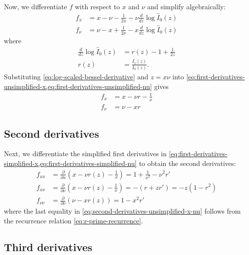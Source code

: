 \documentclass{article}
\begin{document}
Now, we differentiate $f$ with respect to $x$ and $\nu$ and simplify algebraically:
%
\begin{align}
  f_x   & = x-\nu -\frac{1}{2x} - \nu\frac{d}{dz}\log\hat{I}_0(z) \label{eq:first-derivatives-unsimplified-x}  \\
  f_\nu & = \nu-x +\frac{1}{2\nu} - x\frac{d}{dz}\log\hat{I}_0(z) \label{eq:first-derivatives-unsimplified-nu}
\end{align}
%
where
%
\begin{align}
  \frac{d}{dz}\log\hat{I}_0(z) & = r(z) - 1 + \frac{1}{2z} \label{eq:log-scaled-bessel-derivative} \\
  r(z)                         & = \frac{I_1(z)}{I_0(z)}. \label{eq:ratio-r}
\end{align}
%
Substituting \cref{eq:log-scaled-bessel-derivative} and $z=x\nu$ into \cref{eq:first-derivatives-unsimplified-x,eq:first-derivatives-unsimplified-nu} gives
%
\begin{align}
  f_x   & = x - \nu r - \frac{1}{x} \label{eq:first-derivatives-simplified-x} \\
  f_\nu & = \nu - x r \label{eq:first-derivatives-simplified-nu}
\end{align}

\subsection{Second derivatives}

Next, we differentiate the simplified first derivatives in \cref{eq:first-derivatives-simplified-x,eq:first-derivatives-simplified-nu} to obtain the second derivatives:
%
\begin{align}
  f_{xx}     & = \frac{\partial}{\partial x}\left(x - \nu r(z) - \frac{1}{x}\right) = 1 + \frac{1}{x^2} - \nu^2 r' \label{eq:second-derivatives-unsimplified-x-x} \\
  f_{x\nu}   & = \frac{\partial}{\partial \nu}\left(x - \nu r(z) - \frac{1}{x}\right) = -(r + z r') = -z(1 - r^2) \label{eq:second-derivatives-unsimplified-x-nu} \\
  f_{\nu\nu} & = \frac{\partial}{\partial \nu}\left(\nu - x r(z)\right) = 1 - x^2 r' \label{eq:second-derivatives-unsimplified-nu-nu}
\end{align}
%
where the last equality in \cref{eq:second-derivatives-unsimplified-x-nu} follows from the recurrence relation \cref{eq:r-prime-recurrence}.

\subsection{Third derivatives}
\end{document}

